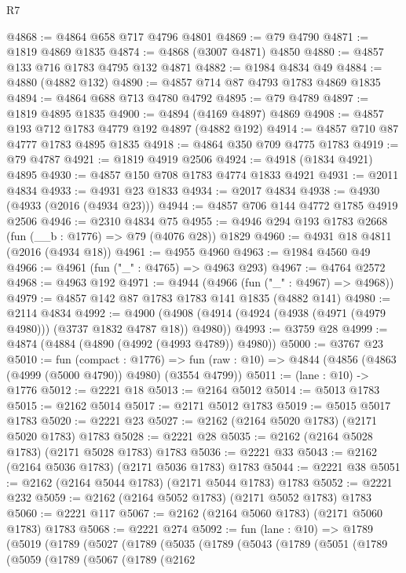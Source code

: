 \begin{lexlean}{R7}
\begin{coremodule}
@4868 := @4864 @658 @717 @4796 @4801
@4869 := @79 @4790
@4871 := @1819 @4869 @1835
@4874 := @4868 (@3007 @4871) @4850
@4880 := @4857 @133 @716 @1783 @4795 @132 @4871
@4882 := @1984 @4834 @49
@4884 := @4880 (@4882 @132)
@4890 := @4857 @714 @87 @4793 @1783 @4869 @1835
@4894 := @4864 @688 @713 @4780 @4792
@4895 := @79 @4789
@4897 := @1819 @4895 @1835
@4900 := @4894 (@4169 @4897) @4869
@4908 := @4857 @193 @712 @1783 @4779 @192 @4897 (@4882 @192)
@4914 := @4857 @710 @87 @4777 @1783 @4895 @1835
@4918 := @4864 @350 @709 @4775 @1783
@4919 := @79 @4787
@4921 := @1819 @4919 @2506
@4924 := @4918 (@1834 @4921) @4895
@4930 := @4857 @150 @708 @1783 @4774 @1833 @4921
@4931 := @2011 @4834
@4933 := @4931 @23 @1833
@4934 := @2017 @4834
@4938 := @4930 (@4933 (@2016 (@4934 @23)))
@4944 := @4857 @706 @144 @4772 @1785 @4919 @2506
@4946 := @2310 @4834 @75
@4955 := @4946 @294 @193 @1783 @2668 (fun (__b : @1776) => @79 (@4076 @28)) @1829
@4960 := @4931 @18 @4811 (@2016 (@4934 @18))
@4961 := @4955 @4960
@4963 := @1984 @4560 @49
@4966 := @4961 (fun ("_" : @4765) => @4963 @293)
@4967 := @4764 @2572
@4968 := @4963 @192
@4971 := @4944 (@4966 (fun ("_" : @4967) => @4968))
@4979 := @4857 @142 @87 @1783 @1783 @141 @1835 (@4882 @141)
@4980 := @2114 @4834
@4992 := @4900 (@4908 (@4914 (@4924 (@4938 (@4971 (@4979 @4980))) (@3737 @1832 @4787 @18)) @4980))
@4993 := @3759 @28
@4999 := @4874 (@4884 (@4890 (@4992 (@4993 @4789)) @4980))
@5000 := @3767 @23
@5010 := fun (compact : @1776) =>
  fun (raw : @10) => @4844 (@4856 (@4863 (@4999 (@5000 @4790)) @4980) (@3554 @4799))
@5011 := (lane : @10) -> @1776
@5012 := @2221 @18
@5013 := @2164 @5012
@5014 := @5013 @1783
@5015 := @2162 @5014
@5017 := @2171 @5012 @1783
@5019 := @5015 @5017 @1783
@5020 := @2221 @23
@5027 := @2162 (@2164 @5020 @1783) (@2171 @5020 @1783) @1783
@5028 := @2221 @28
@5035 := @2162 (@2164 @5028 @1783) (@2171 @5028 @1783) @1783
@5036 := @2221 @33
@5043 := @2162 (@2164 @5036 @1783) (@2171 @5036 @1783) @1783
@5044 := @2221 @38
@5051 := @2162 (@2164 @5044 @1783) (@2171 @5044 @1783) @1783
@5052 := @2221 @232
@5059 := @2162 (@2164 @5052 @1783) (@2171 @5052 @1783) @1783
@5060 := @2221 @117
@5067 := @2162 (@2164 @5060 @1783) (@2171 @5060 @1783) @1783
@5068 := @2221 @274
@5092 := fun (lane : @10) =>
  @1789
    (@5019
      (@1789
        (@5027
          (@1789
            (@5035
              (@1789
                (@5043
                  (@1789
                    (@5051
                      (@1789
                        (@5059
                          (@1789
                            (@5067
                              (@1789
                                (@2162

\end{coremodule}
\end{lexlean}
